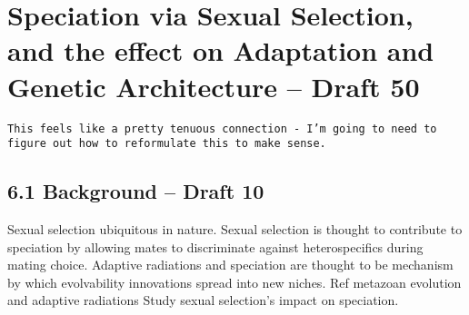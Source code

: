 \section{Speciation via Sexual Selection, and the effect on Adaptation and Genetic Architecture – Draft 50}

\verb|This feels like a pretty tenuous connection - I’m going to need to figure out how to reformulate this to make sense.|

\subsection{6.1 Background – Draft 10}

Sexual selection ubiquitous in nature.
Sexual selection is thought to contribute to speciation by allowing mates to discriminate against heterospecifics during mating choice.
Adaptive radiations and speciation are thought to be mechanism by which evolvability innovations spread into new niches.
Ref metazoan evolution and adaptive radiations
Study sexual selection’s impact on speciation.